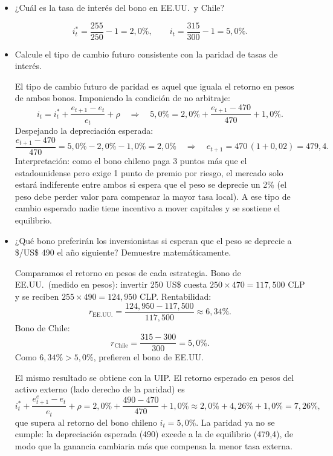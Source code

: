 \documentclass[a4paper]{article}
\begin{document}
\begin{itemize}
    \item[a)] ¿Cu\'al es la tasa de inter\'es del bono en EE.UU.\ y Chile?
    \begin{solution}
        \[
        i_t^* = \frac{255}{250} - 1 = 2{,}0\%, \qquad i_t = \frac{315}{300} - 1 = 5{,}0\%.
        \]
    \end{solution}

    \item[b)] Calcule el tipo de cambio futuro consistente con la paridad de tasas de inter\'es.
    \begin{solution}
        El tipo de cambio futuro de paridad es aquel que iguala el retorno en pesos de ambos bonos. Imponiendo la condici\'on de no arbitraje:
        \[
        i_t = i_t^* + \frac{e_{t+1} - e_t}{e_t} + \rho
        \quad\Rightarrow\quad
        5{,}0\% = 2{,}0\% + \frac{e_{t+1} - 470}{470} + 1{,}0\%.
        \]
        Despejando la depreciaci\'on esperada:
        \[
        \frac{e_{t+1} - 470}{470} = 5{,}0\% - 2{,}0\% - 1{,}0\% = 2{,}0\%
        \quad\Rightarrow\quad
        e_{t+1} = 470 \,(1 + 0{,}02) = 479{,}4.
        \]
        Interpretaci\'on: como el bono chileno paga 3 puntos m\'as que el estadounidense pero exige 1 punto de premio por riesgo, el mercado solo estar\'a indiferente entre ambos si espera que el peso se deprecie un 2\% (el peso debe perder valor para compensar la mayor tasa local). A ese tipo de cambio esperado nadie tiene incentivo a mover capitales y se sostiene el equilibrio.
    \end{solution}

    \item[c)] ¿Qu\'e bono preferir\'an los inversionistas si esperan que el peso se deprecie a \$/US\$ 490 el a\~no siguiente? Demuestre matem\'aticamente.
    \begin{solution}
        Comparamos el retorno en pesos de cada estrategia. Bono de EE.UU.\ (medido en pesos): invertir 250 US\$ cuesta \( 250 \times 470 = 117{,}500 \) CLP y se reciben \( 255 \times 490 = 124{,}950 \) CLP. Rentabilidad:
        \[
        r_{\text{EE.UU.}} = \frac{124{,}950 - 117{,}500}{117{,}500} \approx 6{,}34\%.
        \]
        Bono de Chile:
        \[
        r_{\text{Chile}} = \frac{315 - 300}{300} = 5{,}0\%.
        \]
        Como \( 6{,}34\% > 5{,}0\% \), prefieren el bono de EE.UU.

        \medskip
        El mismo resultado se obtiene con la UIP. El retorno esperado en pesos del activo externo (lado derecho de la paridad) es
        \[
        i_t^* + \frac{e_{t+1}^e - e_t}{e_t} + \rho
        = 2{,}0\% + \frac{490 - 470}{470} + 1{,}0\%
        \approx 2{,}0\% + 4{,}26\% + 1{,}0\% = 7{,}26\%,
        \]
        que supera al retorno del bono chileno \( i_t = 5{,}0\% \). La paridad ya no se cumple: la depreciaci\'on esperada (490) excede a la de equilibrio (479,4), de modo que la ganancia cambiaria m\'as que compensa la menor tasa externa.


\end{solution}
\end{itemize}
\end{document}
